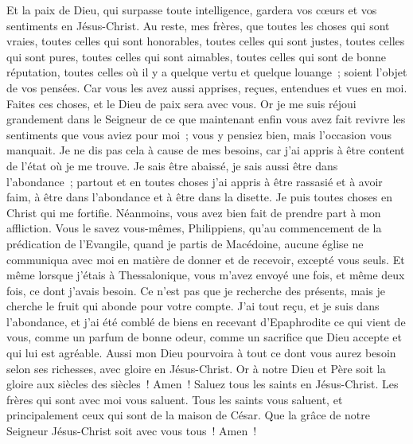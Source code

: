 \begin{multicols}{2}
Et la paix de Dieu, qui surpasse toute intelligence, gardera vos cœurs et vos sentiments en Jésus-Christ.
 Au reste, mes frères, que toutes les choses qui sont vraies, toutes celles qui sont honorables, toutes celles qui sont justes, toutes celles qui sont pures, toutes celles qui sont aimables, toutes celles qui sont de bonne réputation, toutes celles où il y a quelque vertu et quelque louange~; soient l'objet de vos pensées.
Car vous les avez aussi apprises, reçues, entendues et vues en moi. Faites ces choses, et le Dieu de paix sera avec vous.
Or je me suis réjoui grandement dans le Seigneur de ce que maintenant enfin vous avez fait revivre les sentiments que vous aviez pour moi~; vous y pensiez bien, mais l'occasion vous manquait.
Je ne dis pas cela à cause de mes besoins, car j'ai appris à être content de l'état où je me trouve.
Je sais être abaissé, je sais aussi être dans l'abondance~; partout et en toutes choses j'ai appris à être rassasié et à avoir faim, à être dans l'abondance et à être dans la disette.
Je puis toutes choses en Christ qui me fortifie.
Néanmoins, vous avez bien fait de prendre part à mon affliction.
Vous le savez vous-mêmes, Philippiens, qu'au commencement de la prédication de l'Evangile, quand je partis de Macédoine, aucune église ne communiqua avec moi en matière de donner et de recevoir, excepté vous seuls.
Et même lorsque j'étais à Thessalonique, vous m'avez envoyé une fois, et même deux fois, ce dont j'avais besoin.
Ce n'est pas que je recherche des présents, mais je cherche le fruit qui abonde pour votre compte.
J'ai tout reçu, et je suis dans l'abondance, et j'ai été comblé de biens en recevant d'Epaphrodite ce qui vient de vous, comme un parfum de bonne odeur, comme un sacrifice que Dieu accepte et qui lui est agréable.
Aussi mon Dieu pourvoira à tout ce dont vous aurez besoin selon ses richesses, avec gloire en Jésus-Christ.
Or à notre Dieu et Père soit la gloire aux siècles des siècles~! Amen~!
Saluez tous les saints en Jésus-Christ. Les frères qui sont avec moi vous saluent.
Tous les saints vous saluent, et principalement ceux qui sont de la maison de César.
Que la grâce de notre Seigneur Jésus-Christ soit avec vous tous~! Amen~!
\PPE{}
\end{multicols}
